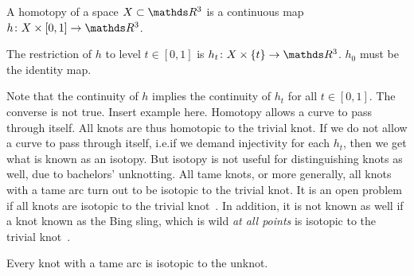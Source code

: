 \begin{defn}[Homotopy]
    A homotopy of a space \(X \subset \rthree\) is a continuous map \(h \colon X \times [0, 1] \rightarrow \rthree\).

    The restriction of \(h\) to level \(t \in [0, 1]\) is \(h_t \colon X \times \{t\} \rightarrow \rthree\). \(h_0\) must be the identity map.
\end{defn}
Note that the continuity of \(h\) implies the continuity of \(h_t\) for all \(t \in [0,1]\). The converse is not true. Insert example here. Homotopy allows a curve to pass through itself. All knots are thus homotopic to the trivial knot. If we do not allow a curve to pass through itself, i.e.\@ if we demand injectivity for each \(h_t\), then we get what is known as an isotopy. But isotopy is not useful for distinguishing knots as well, due to bachelors' unknotting. All tame knots, or more generally, all knots with a tame arc turn out to be isotopic to the trivial knot. It is an open problem if all knots are isotopic to the trivial knot~\cite{ancel, shijie}. In addition, it is not known as well if a knot known as the Bing sling, which is wild \textit{at all points} is isotopic to the trivial knot~\cite{ancel, shijie}.
\begin{prop}
    Every knot with a tame arc is isotopic to the unknot.
\end{prop}
